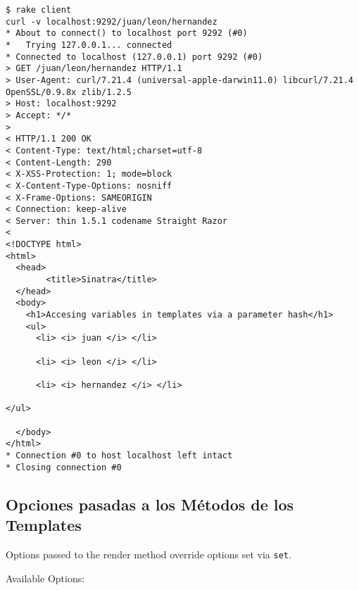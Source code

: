 \begin{verbatim}
$ rake client
curl -v localhost:9292/juan/leon/hernandez
* About to connect() to localhost port 9292 (#0)
*   Trying 127.0.0.1... connected
* Connected to localhost (127.0.0.1) port 9292 (#0)
> GET /juan/leon/hernandez HTTP/1.1
> User-Agent: curl/7.21.4 (universal-apple-darwin11.0) libcurl/7.21.4 OpenSSL/0.9.8x zlib/1.2.5
> Host: localhost:9292
> Accept: */*
> 
< HTTP/1.1 200 OK
< Content-Type: text/html;charset=utf-8
< Content-Length: 290
< X-XSS-Protection: 1; mode=block
< X-Content-Type-Options: nosniff
< X-Frame-Options: SAMEORIGIN
< Connection: keep-alive
< Server: thin 1.5.1 codename Straight Razor
< 
<!DOCTYPE html>
<html>
  <head>
        <title>Sinatra</title>
  </head>
  <body>
    <h1>Accesing variables in templates via a parameter hash</h1>
    <ul>
      <li> <i> juan </i> </li>
    
      <li> <i> leon </i> </li>
    
      <li> <i> hernandez </i> </li>
    
</ul>

  </body>
</html>
* Connection #0 to host localhost left intact
* Closing connection #0
\end{verbatim}

\subsection{Opciones pasadas a los Métodos de los Templates}

Options passed to the render method override options set via \verb|set|.

Available Options:

